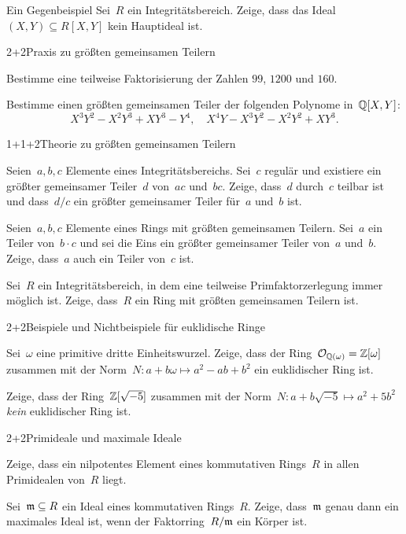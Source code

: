 \documentclass{algblatt}
\begin{document}

\begin{aufgabe}{4}{Ein Gegenbeispiel}
Sei~$R$ ein Integritätsbereich. Zeige, dass das Ideal~$(X,Y) \subseteq R[X,Y]$
kein Hauptideal ist.
\end{aufgabe}

\begin{aufgabeE}{2+2}{Praxis zu größten gemeinsamen Teilern}
\item Bestimme eine teilweise Faktorisierung der Zahlen $99$, $1200$ und $160$.
\item Bestimme einen größten gemeinsamen Teiler der folgenden Polynome
in~$\mathbb{Q}[X,Y]$:
\[ X^3Y^2 - X^2Y^3 + XY^3 - Y^4, \quad X^4Y - X^3Y^2 - X^2Y^2 + XY^3. \]
\end{aufgabeE}
\vspace{-1em}

\begin{aufgabeE}{1+1+2}{Theorie zu größten gemeinsamen Teilern}
\item Seien~$a,b,c$ Elemente eines Integritätsbereichs. Sei~$c$ regulär und
existiere ein größter gemeinsamer Teiler~$d$ von~$ac$ und~$bc$. Zeige, dass~$d$
durch~$c$ teilbar ist und dass~$d/c$ ein größter gemeinsamer Teiler für~$a$
und~$b$ ist.
\item Seien~$a,b,c$ Elemente eines Rings mit größten gemeinsamen Teilern.
Sei~$a$ ein Teiler von~$b \cdot c$ und sei die Eins ein größter gemeinsamer
Teiler von~$a$ und~$b$. Zeige, dass~$a$ auch ein Teiler von~$c$ ist.
\item Sei~$R$ ein Integritätsbereich, in dem eine teilweise Primfaktorzerlegung
immer möglich ist. Zeige, dass~$R$ ein Ring mit größten gemeinsamen Teilern
ist.
\end{aufgabeE}

\begin{aufgabeE}{2+2}{Beispiele und Nichtbeispiele für euklidische Ringe}
\item Sei~$\omega$ eine primitive dritte Einheitswurzel. Zeige, dass der
Ring~$\mathcal{O}_{\mathbb{Q}(\omega)} = \mathbb{Z}[\omega]$ zusammen mit der Norm~$N : a+b\omega
\mapsto a^2 - ab + b^2$ ein euklidischer Ring ist.
\item Zeige, dass der Ring~$\mathbb{Z}[\sqrt{-5}]$ zusammen mit der Norm~$N :
a+b\sqrt{-5} \mapsto a^2 + 5b^2$ \emph{kein} euklidischer Ring ist.
\end{aufgabeE}

\begin{aufgabeE}{2+2}{Primideale und maximale Ideale}
\item Zeige, dass ein nilpotentes Element eines kommutativen Rings~$R$ in allen
Primidealen von~$R$ liegt.
\item Sei~$\mathfrak{m} \subseteq R$ ein Ideal eines kommutativen Rings~$R$. Zeige,
dass~$\mathfrak{m}$ genau dann ein maximales Ideal ist, wenn der Faktorring~$R/\mathfrak{m}$ ein
Körper ist.
\end{aufgabeE}
\end{document}
